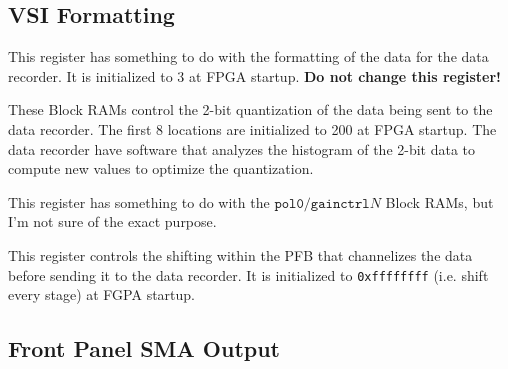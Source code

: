 \documentclass[12pt]{article}
\begin{document}
  \subsection{VSI Formatting}

\begin{description}

 This register has something to do with the formatting of the
data for the data recorder.  It is initialized to 3 at FPGA startup.
\textbf{Do not change this register!}

 These Block RAMs control the 2-bit quantization of the
data being sent to the data recorder.  The first 8 locations are initialized
to 200 at FPGA startup.  The data recorder have software that analyzes the
histogram of the 2-bit data to compute new values to optimize the quantization.

 This register has something to do with the
$\mathtt{pol0/gainctrl}N$ Block RAMs, but I'm not sure of the exact purpose.

  This register controls the shifting within the PFB that
channelizes the data before sending it to the data recorder.  It is
initialized to \verb|0xffffffff| (i.e. shift every stage) at FGPA startup.

\end{description}

\filbreak
  \subsection{Front Panel SMA Output}
\end{document}
